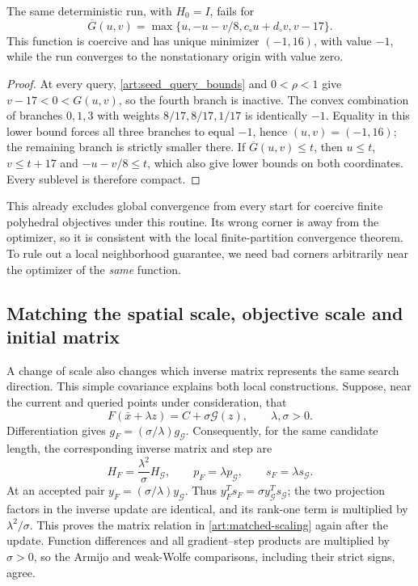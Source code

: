\begin{corollary}\label{art:failure_polyhedral}
The same deterministic run, with $H_0=I$, fails for
\[
 \overline G(u,v)=\max\{u,-u-v/8,c_\circ u+d_\circ v,v-17\}.
\]
This function is coercive and has unique minimizer $(-1,16)$, with value
$-1$, while the run converges to the nonstationary origin with value zero.
\end{corollary}
\begin{proof}
At every query, \eqref{art:seed_query_bounds} and $0<\rho<1$ give
$v-17<0<G(u,v)$, so the fourth branch is inactive. The convex combination
of branches $0,1,3$ with weights $8/17,8/17,1/17$ is identically $-1$.
Equality in this lower bound forces all three branches to equal $-1$,
hence $(u,v)=(-1,16)$; the remaining branch is strictly smaller there.
If $\overline G(u,v)\le t$, then
$u\le t$, $v\le t+17$ and $-u-v/8\le t$, which also give lower bounds
on both coordinates. Every sublevel is therefore compact.
\end{proof}
This already excludes global convergence from every start for coercive finite
polyhedral objectives under this routine. Its wrong corner is away from the
optimizer, so it is consistent with the local finite-partition convergence
theorem. To rule out a local neighborhood guarantee, we need bad corners
arbitrarily near the optimizer of the \emph{same} function.

\subsection{Matching the spatial scale, objective scale and initial matrix}
A change of scale also changes which inverse matrix represents the same
search direction. This simple covariance explains both local constructions.
Suppose, near the current and queried points under consideration, that
\begin{equation}\label{art:matched-local-model}
 F(\bar x+\lambda z)=C+\sigma\mathcal G(z),\qquad \lambda,\sigma>0.
\end{equation}
Differentiation gives $g_F=(\sigma/\lambda)g_{\mathcal G}$. Consequently,
for the same candidate length, the corresponding inverse matrix and step are
\begin{equation}\label{art:matched-scaling}
 H_F=\frac{\lambda^2}{\sigma}H_{\mathcal G},\qquad
 p_F=\lambda p_{\mathcal G},\qquad s_F=\lambda s_{\mathcal G}.
\end{equation}
At an accepted pair $y_F=(\sigma/\lambda)y_{\mathcal G}$. Thus
$y_F^Ts_F=\sigma y_{\mathcal G}^Ts_{\mathcal G}$; the two projection
factors in the inverse update are identical, and its rank-one term is
multiplied by $\lambda^2/\sigma$. This proves the matrix relation in
\eqref{art:matched-scaling} again after the update. Function differences
and all gradient--step products are multiplied by $\sigma>0$, so the
Armijo and weak-Wolfe comparisons, including their strict signs, agree.

